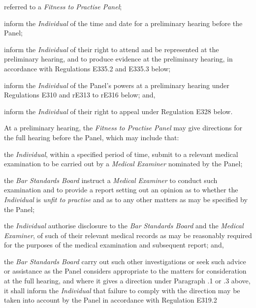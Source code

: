referred to a \emph{Fitness to Practise Panel};\item inform the \emph{Individual} of the time and date for a preliminary
hearing before the Panel;\item inform the \emph{Individual} of their right to attend and be
represented at the preliminary hearing, and to produce evidence at the
preliminary hearing, in accordance with Regulations E335.2 and E335.3
below;\item inform the \emph{Individual} of the Panel's powers at a preliminary
hearing under Regulations E310 and rE313 to rE316 below; and,\item inform the \emph{Individual} of their right to appeal under
Regulation E328 below.\ln
{}\par
{}
At a preliminary hearing, the \emph{Fitness to Practise Panel} may give
directions for the full hearing before the Panel, which may include
that:\\\nl \item the \emph{Individual}, within a specified period of time, submit to a
relevant medical examination to be carried out by a \emph{Medical
Examiner} nominated by the Panel;\item the \emph{Bar Standards Board} instruct a \emph{Medical Examiner} to
conduct such examination and to provide a report setting out an opinion
as to whether the \emph{Individual} is \emph{unfit to practise} and as
to any other matters as may be specified by the Panel;\item the \emph{Individual} authorise disclosure to the \emph{Bar Standards
Board }and the \emph{Medical Examiner}, of such of their relevant
medical records as may be reasonably required for the purposes of the
medical examination and subsequent report; and,\item the \emph{Bar Standards Board }carry out such other investigations or
seek such advice or assistance as the Panel considers appropriate to the
matters for consideration at the full hearing, and where it gives a
direction under Paragraph .1 or .3 above, it shall inform
the \emph{Individual} that failure to comply with the direction may be
taken into account by the Panel in accordance with Regulation E319.2\ln

